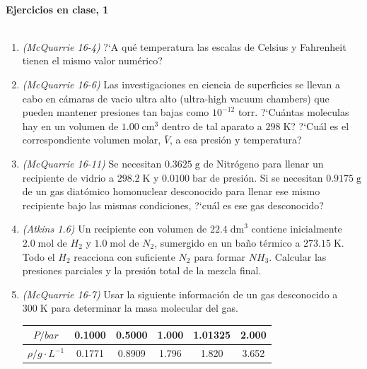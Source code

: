 \documentclass[a4paper,12pt]{article}
\begin{document}

\begin{center}
\HRule \\[0.4cm]
{ \bfseries Ejercicios en clase, 1}\\ %
\HRule \\[0.4cm]
\end{center}


\begin{enumerate}

 \item \textit{(McQuarrie 16-4)} ?`A qu\'e temperatura las escalas de Celsius y Fahrenheit tienen el mismo valor num\'erico? %

 \item \textit{(McQuarrie 16-6)} Las investigaciones en ciencia de superficies se llevan a cabo en c\'amaras de vacio ultra alto (ultra-high vacuum chambers) que pueden mantener presiones tan bajas como $10^{-12}$ torr. ?`Cu\'antas moleculas hay en un volumen de $1.00\;\mbox{cm}^{3}$ dentro de tal aparato a $298\;\mbox{K}$? ?`Cu\'al es el correspondiente volumen molar, $\bar{V}$, a esa presi\'on y temperatura? %

 \item \textit{(McQuarrie 16-11)} Se necesitan $0.3625\;\mbox{g}$ de Nitr\'ogeno para llenar un recipiente de vidrio a $298.2\;\mbox{K}$ y $0.0100\;\mbox{bar}$ de presi\'on. Si se necesitan $0.9175\;\mbox{g}$ de un gas diat\'omico homonuclear desconocido para llenar ese mismo recipiente bajo las mismas condiciones, ?`cu\'al es ese gas desconocido? %

 \item \textit{(Atkins 1.6)} Un recipiente con volumen de $22.4\;\mbox{dm}^3$ contiene inicialmente $2.0\;\mbox{mol}$ de $H_2$ y $1.0\;\mbox{mol}$ de $N_2$, sumergido en un ba\~no t\'ermico a $273.15\;\mbox{K}$. Todo el $H_2$ reacciona con suficiente $N_2$ para formar $NH_3$. Calcular las presiones parciales y la presi\'on total de la mezcla final. %

 \item \textit{(McQuarrie 16-7)} Usar la siguiente informaci\'on de un gas desconocido a $300\;\mbox{K}$ para determinar la masa molecular del gas. %

\begin{center}
\begin{tabular}{c|c c c c c}
$P/bar$ & 0.1000 & 0.5000 & 1.000 & 1.01325 & 2.000 \\\hline
$\rho/g\cdot L^{-1}$ & 0.1771 & 0.8909 & 1.796 & 1.820 & 3.652 
\end{tabular}
\end{center}

\end{enumerate}
 
\end{document}
